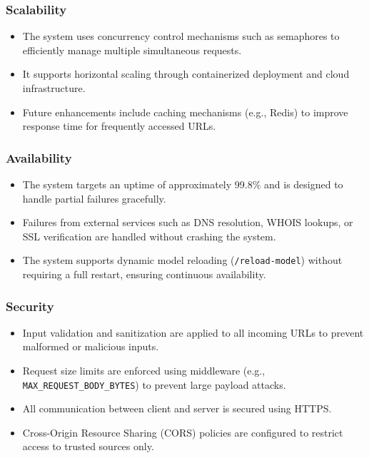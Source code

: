 \subsubsection*{Scalability}

\begin{itemize}
    \item The system uses concurrency control mechanisms such as semaphores to efficiently manage multiple simultaneous requests.
    
    \item It supports horizontal scaling through containerized deployment and cloud infrastructure.
    
    \item Future enhancements include caching mechanisms (e.g., Redis) to improve response time for frequently accessed URLs.
\end{itemize}

\subsubsection*{Availability}

\begin{itemize}
    \item The system targets an uptime of approximately 99.8\% and is designed to handle partial failures gracefully.
    
    \item Failures from external services such as DNS resolution, WHOIS lookups, or SSL verification are handled without crashing the system.
    
    \item The system supports dynamic model reloading (\texttt{/reload-model}) without requiring a full restart, ensuring continuous availability.
\end{itemize}

\subsubsection*{Security}

\begin{itemize}
    \item Input validation and sanitization are applied to all incoming URLs to prevent malformed or malicious inputs.
    
    \item Request size limits are enforced using middleware (e.g., \texttt{MAX\_REQUEST\_BODY\_BYTES}) to prevent large payload attacks.
    
    \item All communication between client and server is secured using HTTPS.
    
    \item Cross-Origin Resource Sharing (CORS) policies are configured to restrict access to trusted sources only.
\end{itemize}

